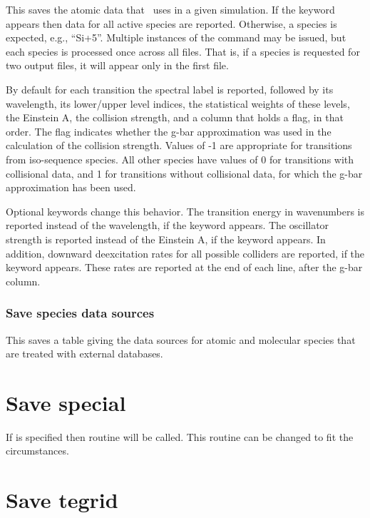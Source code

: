 This saves the atomic data that \Cloudy\ uses in a given simulation.
If the keyword  appears then data for
all active species are reported.
Otherwise, a species is expected, e.g., ``Si+5''.
Multiple instances of the command may be issued, but each species is
processed once across all files.
That is, if a species is requested for two output files, it will appear
only in the first file.

\par
By default for each transition the spectral label is reported,
followed by its wavelength, its lower/upper level indices,
the statistical weights of these levels, the Einstein A,
the collision strength, and a column that holds a flag,
in that order.
The flag indicates whether the g-bar approximation was used in
the calculation of the collision strength.
Values of -1 are appropriate for transitions from iso-sequence species.
All other species have values of 0 for transitions with collisional
data, and 1 for transitions without collisional data, for which the
g-bar approximation has been used.

\par
Optional keywords change this behavior.
The transition energy in wavenumbers is reported instead of the wavelength,
if the keyword  appears. 
The oscillator strength is reported instead of the Einstein A,
if the keyword  appears.
In addition, downward deexcitation rates for all possible colliders are reported,
if the keyword  appears.
These rates are reported at the end of each line, after the g-bar column.


\subsubsection{Save species data sources}

This saves a table giving the data sources for atomic and molecular species that are
treated with external databases.  

\section{Save special}

If  is specified then routine
 will be called.
This routine can be changed to fit the circumstances.

\section{Save tegrid}

